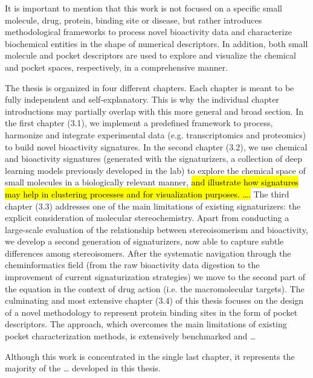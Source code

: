 It is important to mention that this work is not focused on a specific small molecule, drug, protein, binding site or disease, but rather introduces methodological frameworks to process novel bioactivity data and characterize biochemical entities in the shape of numerical descriptors. In addition, both small molecule and pocket descriptors are used to explore and visualize the chemical and pocket spaces, respectively, in a comprehensive manner. 

The thesis is organized in four different chapters. Each chapter is meant to be fully independent and self-explanatory. This is why the individual chapter introductions may partially overlap with this more general and broad section. In the first chapter (3.1), we implement a predefined framework to process, harmonize and integrate experimental data (e.g. transcriptomics and proteomics) to build novel bioactivity signatures. In the second chapter (3.2), we use chemical and bioactivity signatures (generated with the signaturizers, a collection of deep learning models previously developed in the lab) to explore the chemical space of small molecules in a biologically relevant manner, \hl{and illustrate how signatures may help in clustering processes and for visualization purposes. ….}  The third chapter (3.3) addresses one of the main limitations of existing signaturizers: the explicit consideration of molecular stereochemistry. Apart from conducting a large-scale evaluation of the relationship between stereoisomerism and bioactivity, we develop a second generation of signaturizers, now able to capture subtle differences among stereoisomers. After the systematic navigation through the cheminformatics field (from the raw bioactivity data digestion to the improvement of current signaturization strategies) we move to the second part of the equation in the context of drug action (i.e. the macromolecular targets). The culminating and most extensive chapter (3.4) of this thesis focuses on the design of a novel methodology to represent protein binding sites in the form of pocket descriptors. The approach, which overcomes the main limitations of existing pocket characterization methods, is extensively benchmarked and … 

Although this work is concentrated in the single last chapter, it represents the majority of the … developed in this thesis. 






\renewcommand{\thesubsection}{\thechapter.\arabic{section}.\arabic{subsection}}
